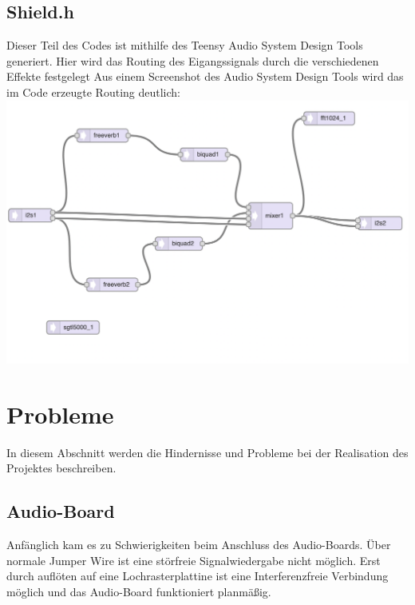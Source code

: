 \documentclass[12pt]{article}
\begin{document}
\subsection{Shield.h}
Dieser Teil des Codes ist mithilfe des Teensy Audio System Design Tools generiert. Hier wird das Routing des Eigangssignals durch die verschiedenen Effekte festgelegt 
Aus einem Screenshot des Audio System Design Tools wird das im Code erzeugte Routing deutlich:
\\
\includegraphics[width=\textwidth]{AudioDesignTool}

\newpage
\section{Probleme}
In diesem Abschnitt werden die Hindernisse und Probleme bei der Realisation des Projektes beschreiben.
\subsection{Audio-Board}
Anfänglich kam es zu Schwierigkeiten beim Anschluss des Audio-Boards. Über normale Jumper Wire ist eine störfreie Signalwiedergabe nicht möglich. 
Erst durch auflöten auf eine Lochrasterplattine ist eine Interferenzfreie Verbindung möglich und das Audio-Board funktioniert planmäßig.
\end{document}
